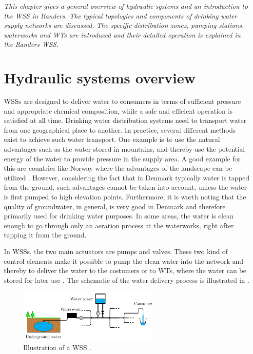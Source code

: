 \emph{This chapter gives a general overview of hydraulic systems and an introduction to the WSS in Randers. The typical topologies and components of drinking water supply networks are discussed. The specific distribution zones, pumping stations, waterworks and WTs are introduced and their detailed operation is explained in the Randers WSS.}

\section{Hydraulic systems overview}
\label{hydraulic_system_overview}

WSSs are designed to deliver water to consumers in terms of sufficient pressure and appropriate chemical composition, while a safe and efficient operation is satisfied at all time. Drinking water distribution systems need to transport water from one geographical place to another. In practice, several different methods exist to achieve such water transport. One example is to use the natural advantages such as the water stored in mountains, and thereby use the potential energy of the water to provide pressure in the supply area. A good example for this are countries like Norway where the advantages of the landscape can be utilized \cite{norway_mountains}. However, considering the fact that in Denmark typically water is tapped from the ground, such advantages cannot be taken into account, unless the water is first pumped to high elevation points. Furthermore, it is worth noting that the quality of groundwater, in general, is very good in Denmark and therefore primarily used for drinking water purposes. In some areas, the water is clean enough to go through only an aeration process at the waterworks, right after tapping it from the ground. 

In WSSs, the two main actuators are pumps and valves. These two kind of control elements make it possible to pump the clean water into the network and thereby to deliver the water to the costumers or to WTs, where the water can be stored for later use \cite{prahata}. The schematic of the water delivery process is illustrated in .

\begin{figure}[H]
\centering
\includegraphics[width=0.63\textwidth]{report/pictures/WSS_illustration}
\caption{Illustration of a WSS \cite{kenneth_houe}.}
\label{fig:WSS_example}
\end{figure}

